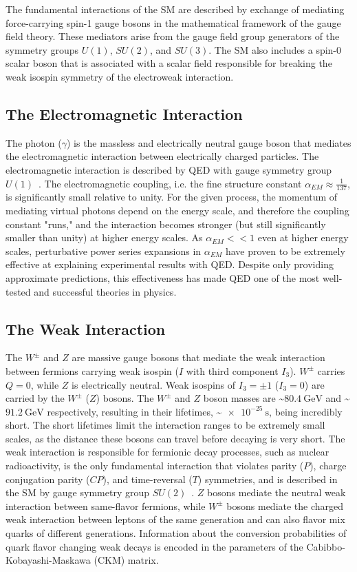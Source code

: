 The fundamental interactions of the SM are described by exchange of mediating force-carrying spin-1 gauge bosons in the mathematical framework of the gauge field theory.
These mediators arise from the gauge field group generators of the symmetry groups $U(1)$, $SU(2)$, and $SU(3)$.
The SM also includes a spin-0 scalar boson that is associated with a scalar field responsible for breaking the weak isospin symmetry of the electroweak interaction.

\subsection{The Electromagnetic Interaction}
The photon ($\gamma$) is the massless and electrically neutral gauge boson that mediates the electromagnetic interaction between electrically charged particles.
The electromagnetic interaction is described by QED with gauge symmetry group $U(1)$~\cite{nagashima_2013_V1}.
The electromagnetic coupling, i.e. the fine structure constant $\alpha_{EM} \approx \frac{1}{137}$, is significantly small relative to unity.
For the given process, the momentum of mediating virtual photons depend on the energy scale, and therefore the coupling constant "runs," and the interaction becomes stronger (but still significantly smaller than unity) at higher energy scales.
As $\alpha_{EM} << 1$ even at higher energy scales, perturbative power series expansions in $\alpha_{EM}$ have proven to be extremely effective at explaining experimental results with QED.
Despite only providing approximate predictions, this effectiveness has made QED one of the most well-tested and successful theories in physics.

\subsection{The Weak Interaction}
The $W^\pm$ and $Z$ are massive gauge bosons that mediate the weak interaction between fermions carrying weak isospin ($I$ with third component $I_3$).
$W^\pm$ carries $Q = 0$, while $Z$ is electrically neutral.
Weak isospins of $I_3 = \pm 1$ ($I_3 = 0$) are carried by the $W^\pm$ ($Z$) bosons.
The $W^\pm$ and $Z$ boson masses are \sim$\SI{80.4}{\GeV}$ and \sim$\SI{91.2}{\GeV}$ respectively, resulting in their lifetimes, \sim$\SI{e-25}{\s}$, being incredibly short.
The short lifetimes limit the interaction ranges to be extremely small scales, as the distance these bosons can travel before decaying is very short.
The weak interaction is responsible for fermionic decay processes, such as nuclear radioactivity, is the only fundamental interaction that violates parity ($P$), charge conjugation parity ($CP$), and time-reversal ($T$) symmetries, and is described in the SM by gauge symmetry group $SU(2)$~\cite{nagashima_2013_V1}.
$Z$ bosons mediate the neutral weak interaction between same-flavor fermions, while $W^\pm$ bosons mediate the charged weak interaction between leptons of the same generation and can also flavor mix quarks of different generations.
Information about the conversion probabilities of quark flavor changing weak decays is encoded in the parameters of the Cabibbo-Kobayashi-Maskawa (CKM) matrix.

